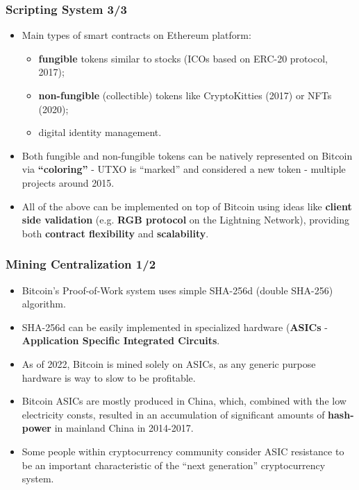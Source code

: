 \documentclass{beamer}
\begin{document}
\begin{frame}
  \frametitle{Scripting System 3/3}
  \begin{itemize}
  \item Main types of smart contracts on Ethereum platform:
    \begin{itemize}
    \item \textbf{fungible} tokens similar to stocks (ICOs based on ERC-20
      protocol, 2017);
    \item \textbf{non-fungible} (collectible) tokens like CryptoKitties (2017)
      or NFTs (2020);
    \item digital identity management.
    \end{itemize}
  \item Both fungible and non-fungible tokens can be natively represented on
    Bitcoin via \textbf{``coloring''} - UTXO is ``marked'' and considered a new
    token - multiple projects around 2015.
  \item All of the above can be implemented on top of Bitcoin using ideas like
    \textbf{client side validation} (e.g. \textbf{RGB protocol} on the Lightning
    Network), providing both \textbf{contract flexibility} and
    \textbf{scalability}.
  \end{itemize}
\end{frame}

\begin{frame}
  \frametitle{Mining Centralization 1/2}
  \begin{itemize}
  \item Bitcoin's Proof-of-Work system uses simple SHA-256d (double SHA-256)
    algorithm.
  \item SHA-256d can be easily implemented in specialized hardware
    (\textbf{ASICs} - \textbf{Application Specific Integrated Circuits}.
  \item As of 2022, Bitcoin is mined solely on ASICs, as any generic purpose
    hardware is way to slow to be profitable.
  \item Bitcoin ASICs are mostly produced in China, which, combined with the low
    electricity consts, resulted in an accumulation of significant amounts of
    \textbf{hash-power} in mainland China in 2014-2017.
  \item Some people within cryptocurrency community consider ASIC resistance to
    be an important characteristic of the ``next generation'' cryptocurrency
    system.
  \end{itemize}
\end{frame}
\end{document}
